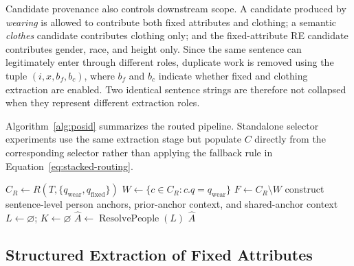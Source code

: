 \documentclass[sigconf,nonacm]{acmart}
\newcommand{\posid}{\textsc{POSID}}
\begin{document}
Candidate provenance also controls downstream scope.  A candidate produced by
\emph{wearing} is allowed to contribute both fixed attributes and clothing; a
semantic \emph{clothes} candidate contributes clothing only; and the
fixed-attribute RE candidate contributes gender, race, and height only.  Since
the same sentence can legitimately enter through different roles, duplicate
work is removed using the tuple
$(i,x,b_f,b_c)$, where $b_f$ and $b_c$ indicate whether fixed and clothing
extraction are enabled.  Two identical sentence strings are therefore not
collapsed when they represent different extraction roles.

Algorithm~\ref{alg:posid} summarizes the routed pipeline.  Standalone selector
experiments use the same extraction stage but populate $C$ directly from the
corresponding selector rather than applying the fallback rule in
Equation~\ref{eq:stacked-routing}.

\begin{algorithm}[t]
\caption{Candidate routing and structured \posid{} recovery}
\label{alg:posid}
$C_R \leftarrow R(T,\{q_{\mathrm{wear}},q_{\mathrm{fixed}}\})$\;
$W \leftarrow \{c\in C_R : c.q=q_{\mathrm{wear}}\}$\;
$F \leftarrow C_R\setminus W$\;
construct sentence-level person anchors, prior-anchor context, and shared-anchor context\;
$L\leftarrow\varnothing$; $K\leftarrow\varnothing$ 
$\widehat{A}\leftarrow\operatorname{ResolvePeople}(L)$\;
\Return $\widehat{A}$\;
\end{algorithm}

\subsection{Structured Extraction of Fixed Attributes}
\label{subsec:fixed-extraction}
\end{document}

